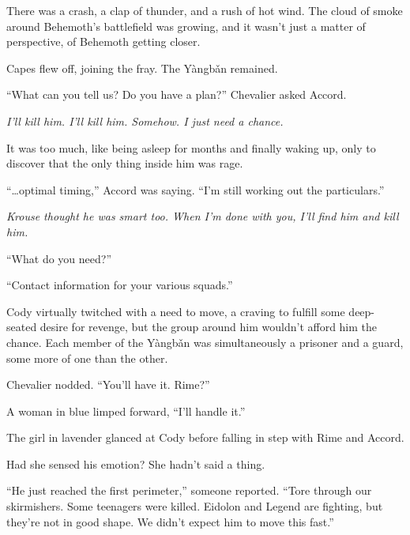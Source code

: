 There was a crash, a clap of thunder, and a rush of hot wind.  The cloud of smoke around Behemoth's battlefield was growing, and it wasn't just a matter of perspective, of Behemoth getting closer.



Capes flew off, joining the fray.  The Y\`{a}ngb\v{a}n remained.



``What can you tell us?  Do you have a plan?'' Chevalier asked Accord.



\emph{I'll kill him.  I'll kill him.  Somehow.  I just need a chance.}



It was too much, like being asleep for months and finally waking up, only to discover that the only thing inside him was rage.



``\ldots{}optimal timing,'' Accord was saying.  ``I'm still working out the particulars.''



\emph{Krouse thought he was smart too.  When I'm done with you, I'll find him and kill him.  }



``What do you need?''



``Contact information for your various squads.''



Cody virtually twitched with a need to move, a craving to fulfill some deep-seated desire for revenge, but the group around him wouldn't afford him the chance.  Each member of the Y\`{a}ngb\v{a}n was simultaneously a prisoner and a guard, some more of one than the other.



Chevalier nodded.  ``You'll have it.  Rime?''



A woman in blue limped forward, ``I'll handle it.''



The girl in lavender glanced at Cody before falling in step with Rime and Accord.



Had she sensed his emotion?  She hadn't said a thing.



``He just reached the first perimeter,'' someone reported.  ``Tore through our skirmishers.  Some teenagers were killed.  Eidolon and Legend are fighting, but they're not in good shape.  We didn't expect him to move this fast.''




